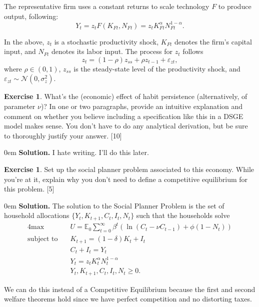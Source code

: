 \documentclass[11pt]{article}
\numberwithin{equation}{section} %
\numberwithin{figure}{section} %
\numberwithin{table}{section} %
\theoremstyle{definition}
\newtheorem{exercise}[theorem]{Exercise}
\newenvironment{solution}{\begin{addmargin}[2em]{0em} {\bf Solution. }}{\end{addmargin}}
\newcommand{\E}{\mathbb{E}}
\begin{document}
The representative firm uses a constant returns to scale technology $F$ to produce output, following:
\[
    Y_t = z_t F\left(K_{Ft}, N_{Ft}\right) = z_t K_{Ft}^\alpha N_{Ft}^{1-\alpha}.
\]

In the above, $z_t$ is a stochastic productivity shock, $K_{Ft}$ denotes the firm's capital input, and $N_{Ft}$ denotes its labor input. The process for $z_t$ follows
\[
    z_t =(1-\rho)z_{ss} + \rho z_{t-1} + \varepsilon_{zt},
\]
where $\rho \in (0,1)$, $z_{ss}$ is the steady-state level of the productivity shock, and $\varepsilon_{zt} \sim \mathcal{N}(0,\sigma_{z}^2)$.

\begin{exercise}
    What's the (economic) effect of habit persistence (alternatively, of parameter $\nu$)? In one or two paragraphs, provide an intuitive explanation and comment on whether you believe including a specification like this in a DSGE model makes sense. You don't have to do any analytical derivation, but be sure to thoroughly justify your answer. [10]
\end{exercise}

\begin{solution}
    I hate writing. I'll do this later.
\end{solution}


\begin{exercise}
    Set up the social planner problem associated to this economy. While you're at it, explain why you don't need to define a competitive equilibrium for this problem. [5]
\end{exercise}

\begin{solution}
    The solution to the Social Planner Problem is the set of household allocations $\{Y_t, K_{t+1}, C_t, I_t, N_t\}$ such that the households solve
    \begin{alignat*}{4}
        \text{max} \quad & U = \E_0 \sum_{t=0}^\infty \beta^t \left( \ln \left(C_t - \nu C_{t-1}\right) + \phi \left(1 - N_t\right) \right) \\
        \text{subject to} \quad & K_{t + 1} = (1 - \delta)K_t + I_t \\
        & C_t + I_t = Y_t \\
        & Y_t = z_t K_t^\alpha N_t^{1 - \alpha} \\
        & Y_t, K_{t+1}, C_t, I_t, N_t \geq 0.
    \end{alignat*}

    We can do this instead of a Competitive Equilibrium because the first and second welfare theorems hold since we have perfect competition and no distorting taxes.
\end{solution}
\end{document}
